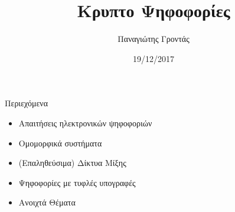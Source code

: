 \documentclass[handout]{beamer}
\title{Κρυπτο Ψηφοφορίες}
\author{Παναγιώτης Γροντάς}
\date{19/12/2017}
\institute{ΕΜΠ - Κρυπτογραφία - (2017-2018)}
\begin{document}
\newcommand{\xor}{\oplus }
\newcommand{\MSG}{\mathtt{M}}
\newcommand{\KEY}{\mathtt{K}}
\newcommand{\CPH}{\mathtt{C}}
\newcommand{\keygen}{\mathtt{KeyGen}}
\newcommand{\enc}{\mathtt{Enc}}
\newcommand{\dec}{\mathtt{Dec}}
\newcommand{\adv}{$\mathcal{A} $ }
\newcommand{\advb}{$\mathcal{B} $ }
\newcommand{\chal}{$\mathcal{C} $ }
\newcommand{\cs}{$\mathcal{CS} $ }
\newcommand{\zns}{\mathbb{Z}^*_n }
\newcommand{\zs}[1]{\mathbb{Z}^*_{#1} }

\newcommand{\green}[1]{\textcolor{teal}{#1}}
\newcommand{\Green}[1]{\textcolor{Teal}{#1}}
\newcommand{\ForestGreen}[1]{\textcolor{ForestGreen}{#1}}
\newcommand{\blue}[1]{\textcolor{blue}{#1}}
\newcommand{\magenta}[1]{\textcolor{magenta}{#1}}
\newcommand{\cyan}[1]{\textcolor{cyan}{#1}}

\newcommand{\twopartdef}[4]
{ 
		\begin{cases}
			#1 , #2 \\
			#3 , #4
		\end{cases} 
}
\begin{frame}
\titlepage
\end{frame}


\npthousandsep{ }

\begin{frame}{Περιεχόμενα}
    \begin{itemize}
        \item Απαιτήσεις ηλεκτρονικών ψηφοφοριών \pause
        \item Ομομορφικά συστήματα \pause
        \item (Επαληθεύσιμα) Δίκτυα Μίξης \pause
        \item Ψηφοφορίες με τυφλές υπογραφές \pause
        \item Ανοιχτά Θέματα \pause
    \end{itemize}
\end{frame}
\end{document}
